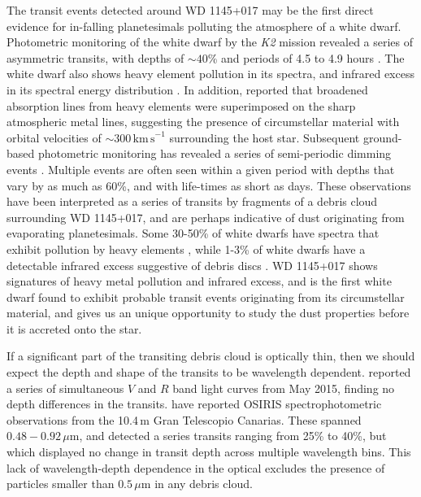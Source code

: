 \documentclass[apj]{emulateapj}
\begin{document}
The transit events detected around WD 1145+017 may be the first direct evidence for in-falling planetesimals polluting the atmosphere of a white dwarf. Photometric monitoring of the white dwarf by the \emph{K2} mission revealed a series of asymmetric transits, with depths of $\sim 40$\% and periods of 4.5 to 4.9 hours \citep{2015Natur.526..546V}. The white dwarf also shows heavy element pollution in its spectra, and infrared excess in its spectral energy distribution \citep{2015Natur.526..546V,2016ApJ...816L..22X}. In addition, \citet{2016ApJ...816L..22X} reported that broadened absorption lines from heavy elements were superimposed on the sharp atmospheric metal lines, suggesting the presence of circumstellar material with orbital velocities of $\sim 300\,\mathrm{km\,s}^{-1}$ surrounding the host star. Subsequent ground-based photometric monitoring has revealed a series of semi-periodic dimming events \citep{2015Natur.526..546V,2015arXiv151006434C,2016ApJ...818L...7G,2016MNRAS.tmp..406R,2016arXiv160308823A}. Multiple events are often seen within a given period with depths that vary by as much as 60\%, and with life-times as short as days. These observations have been interpreted as a series of transits by fragments of a debris cloud surrounding WD 1145+017, and are perhaps indicative of dust originating from evaporating planetesimals. Some 30-50\% of white dwarfs have spectra that exhibit pollution by heavy elements \citep[e.g.][]{2003ApJ...596..477Z,2010ApJ...722..725Z,2014A&A...566A..34K}, while 1-3\% of white dwarfs have a detectable infrared excess suggestive of debris discs \citep[e.g.][]{2003ApJ...584L..91J,2007ApJS..171..206M,2009ApJ...694..805F,2011MNRAS.417.1210G,2011ApJS..197...38D}. WD 1145+017 shows signatures of heavy metal pollution and infrared excess, and is the first white dwarf found to exhibit probable transit events originating from its circumstellar material, and gives us an unique opportunity to study the dust properties before it is accreted onto the star. 

If a significant part of the transiting debris cloud is optically thin, then we should expect the depth and shape of the transits to be wavelength dependent. \citet{2015arXiv151006434C} reported a series of simultaneous $V$ and $R$ band light curves from May 2015, finding no depth differences in the transits. \citet{2016arXiv160308823A} have reported OSIRIS spectrophotometric observations from the 10.4\,m Gran Telescopio Canarias. These spanned $0.48-0.92\,\mu\mathrm{m}$, and detected a series transits ranging from 25\% to 40\%, but which displayed no change in transit depth across multiple wavelength bins. This lack of wavelength-depth dependence in the optical excludes the presence of particles smaller than $ 0.5\,\mu \mathrm{m}$ in any debris cloud. 
\end{document}
